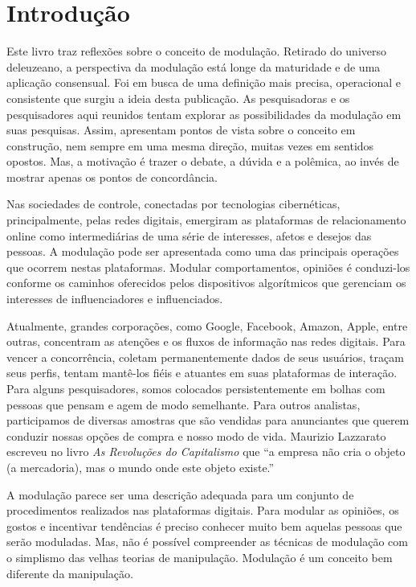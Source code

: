 \chapter{Introdução}

Este livro traz reflexões sobre o conceito de modulação. Retirado do
universo deleuzeano, a perspectiva da modulação está longe da maturidade
e de uma aplicação consensual. Foi em busca de uma definição mais
precisa, operacional e consistente que surgiu a ideia desta publicação.
As pesquisadoras e os pesquisadores aqui reunidos tentam explorar as
possibilidades da modulação em suas pesquisas. Assim, apresentam pontos
de vista sobre o conceito em construção, nem sempre em uma mesma
direção, muitas vezes em sentidos opostos. Mas, a motivação é trazer o
debate, a dúvida e a polêmica, ao invés de mostrar apenas os pontos de
concordância.

Nas sociedades de controle, conectadas por tecnologias cibernéticas,
principalmente, pelas redes digitais, emergiram as plataformas de
relacionamento online como intermediárias de uma série de interesses,
afetos e desejos das pessoas. A modulação pode ser apresentada como uma
das principais operações que ocorrem nestas plataformas. Modular
comportamentos, opiniões é conduzi-los conforme os caminhos oferecidos
pelos dispositivos algorítmicos que gerenciam os interesses de
influenciadores e influenciados.

Atualmente, grandes corporações, como Google, Facebook, Amazon,
Apple, entre outras, concentram as atenções e os fluxos de informação
nas redes digitais. Para vencer a concorrência, coletam permanentemente
dados de seus usuários, traçam seus perfis, tentam mantê-los fiéis e
atuantes em suas plataformas de interação. Para alguns pesquisadores,
somos colocados persistentemente em bolhas com pessoas que
pensam e agem de modo semelhante. Para outros analistas, participamos de
diversas amostras que são vendidas para anunciantes que querem conduzir
nossas opções de compra e nosso modo de vida. Maurizio Lazzarato
escreveu no livro \emph{As Revoluções do Capitalismo} que ``a
empresa não cria o objeto (a mercadoria), mas o mundo onde este objeto existe.''

A modulação parece ser uma descrição adequada para um conjunto de
procedimentos realizados nas plataformas digitais. Para modular as
opiniões, os gostos e incentivar tendências é preciso conhecer muito bem
aquelas pessoas que serão moduladas. Mas, não é possível compreender as
técnicas de modulação com o simplismo das velhas teorias de manipulação.
Modulação é um conceito bem diferente da manipulação.

